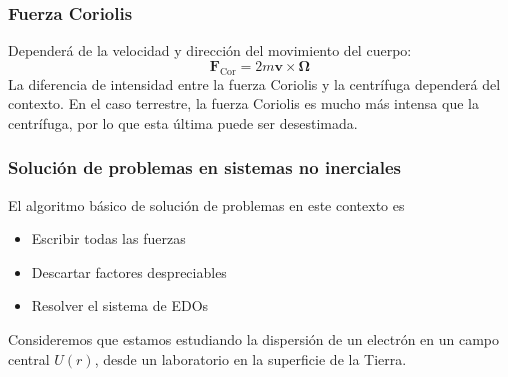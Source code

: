 \documentclass[]{article}
\numberwithin{equation}{section}
\begin{document}
\subsubsection{Fuerza Coriolis}
Dependerá de la velocidad y dirección del movimiento del cuerpo:
\begin{equation}
	\mathbf{F}_{\mathrm{Cor}} = 2 m \mathbf{v}\times\mathbf{\Omega}
\end{equation}
La diferencia de intensidad entre la fuerza Coriolis y la centrífuga dependerá del contexto. En el caso terrestre, la fuerza Coriolis es mucho más intensa que la centrífuga, por lo que esta última puede ser desestimada.

\subsubsection{Solución de problemas en sistemas no inerciales}\label{seccion_ProblemasNoInerciales}
El algoritmo básico de solución de problemas en este contexto es
\begin{itemize}
	\item[\(\rightarrow\)] Escribir todas las fuerzas
	\item[\(\rightarrow\)] Descartar factores despreciables
	\item[\(\rightarrow\)] Resolver el sistema de EDOs
\end{itemize}

Consideremos que estamos estudiando la dispersión de un electrón en un campo central \(U(r)\), desde un laboratorio en la superficie de la Tierra.
\end{document}
